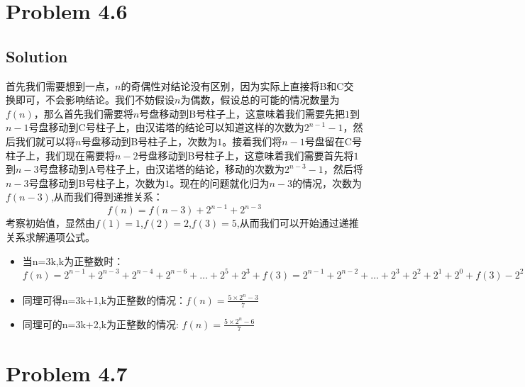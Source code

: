 \documentclass[a4paper]{ctexart}
\begin{document}
\section{Problem 4.6}
\subsection{Solution}
首先我们需要想到一点，$n$的奇偶性对结论没有区别，因为实际上直接将B和C交换即可，不会影响结论。我们不妨假设$n$为偶数，假设总的可能的情况数量为$f(n)$，那么首先我们需要将$n$号盘移动到B号柱子上，这意味着我们需要先把$1$到$n-1$号盘移动到C号柱子上，由汉诺塔的结论可以知道这样的次数为$2^{n-1}-1$，然后我们就可以将$n$号盘移动到B号柱子上，次数为$1$。接着我们将$n-1$号盘留在C号柱子上，我们现在需要将$n-2$号盘移动到B号柱子上，这意味着我们需要首先将$1$到$n-3$号盘移动到A号柱子上，由汉诺塔的结论，移动的次数为$2^{n-3}-1$，然后将$n-3$号盘移动到B号柱子上，次数为$1$。现在的问题就化归为$n-3$的情况，次数为$f(n-3)$,从而我们得到递推关系：
\begin{equation}
    f(n) = f(n-3)+2^{n-1}+2^{n-3}
\end{equation}
考察初始值，显然由$f(1)=1$,$f(2)=2$,$f(3)=5$,从而我们可以开始通过递推关系求解通项公式。
\par
\begin{itemize}
    \item 当n=3k,k为正整数时：$f(n)=2^{n-1}+2^{n-3}+2^{n-4}+2^{n-6}+\dots+2^5+2^3+f(3)=2^{n-1}+2^{n-2}+\dots+2^3+2^2+2^1+2^0+f(3)-2^2-2^0-(2^{n-1}+2^{n-4}+\dots+2^4+2^1)=\frac{5\times 2^n-5}{7}$
    \item 同理可得n=3k+1,k为正整数的情况：$f(n) = \frac{5\times 2^n-3}{7}$
    \item 同理可的n=3k+2,k为正整数的情况: $f(n)=\frac{5\times 2^n-6}{7}$
\end{itemize}

\section{Problem 4.7}
\end{document}
